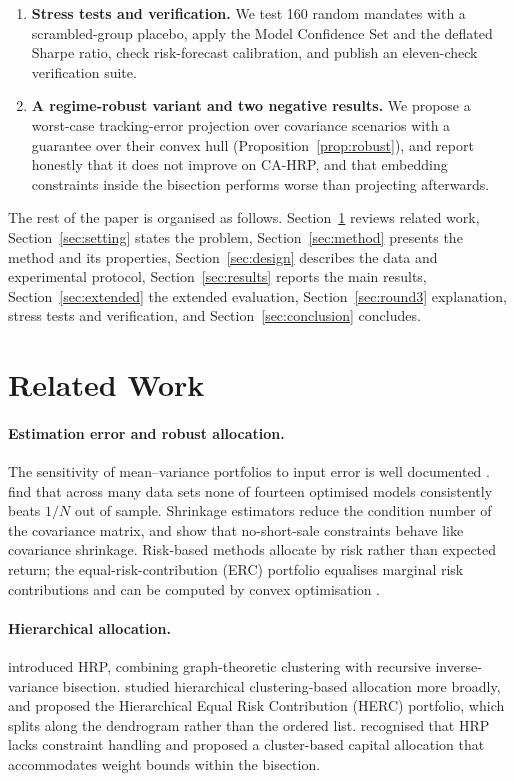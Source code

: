 \begin{enumerate}
in these ratios can matter (Proposition~\ref{prop:scale}), and report its mixed effect.
\item \textbf{Stress tests and verification.} We test 160 random mandates with a
scrambled-group placebo, apply the Model Confidence Set and the deflated Sharpe ratio, check
risk-forecast calibration, and publish an eleven-check verification suite.
\item \textbf{A regime-robust variant and two negative results.} We propose a worst-case
tracking-error projection over covariance scenarios with a guarantee over their convex hull
(Proposition~\ref{prop:robust}), and report honestly that it does not improve on CA-HRP,
and that embedding constraints inside the bisection performs worse than projecting
afterwards.
\end{enumerate}

The rest of the paper is organised as follows. Section~\ref{sec:related} reviews related
work, Section~\ref{sec:setting} states the problem, Section~\ref{sec:method} presents the
method and its properties, Section~\ref{sec:design} describes the data and experimental
protocol, Section~\ref{sec:results} reports the main results, Section~\ref{sec:extended}
the extended evaluation, Section~\ref{sec:round3} explanation, stress tests and
verification, and Section~\ref{sec:conclusion} concludes.

\section{Related Work}\label{sec:related}

\paragraph{Estimation error and robust allocation.} The sensitivity of mean--variance
portfolios to input error is well documented \citep{michaud1989,chopra1993}.
\citet{demiguel2009} find that across many data sets none of fourteen optimised models
consistently beats $1/N$ out of sample. Shrinkage estimators \citep{ledoit2004} reduce the
condition number of the covariance matrix, and \citet{jagannathan2003} show that
no-short-sale constraints behave like covariance shrinkage. Risk-based methods allocate by
risk rather than expected return; the equal-risk-contribution (ERC) portfolio
\citep{maillard2010} equalises marginal risk contributions and can be computed by convex
optimisation \citep{spinu2013}.

\paragraph{Hierarchical allocation.} \citet{lopezdeprado2016} introduced HRP, combining
graph-theoretic clustering with recursive inverse-variance bisection. \citet{raffinot2017}
studied hierarchical clustering-based allocation more broadly, and \citet{raffinot2018}
proposed the Hierarchical Equal Risk Contribution (HERC) portfolio, which splits along the
dendrogram rather than the ordered list. \citet{pfitzinger2019} recognised that HRP lacks
constraint handling and proposed a cluster-based capital allocation that accommodates
weight bounds within the bisection.

